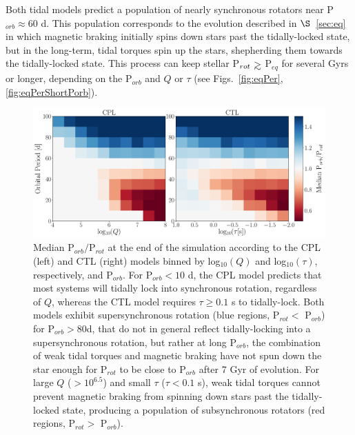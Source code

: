 \documentclass[twocolumn]{aastex61}
\def\gsim{~\rlap{$>$}{\lower 1.0ex\hbox{$\sim$}}}
\begin{document}
Both tidal models predict a population of nearly synchronous rotators near P$_{orb} \approx 60$ d.  This population corresponds to the evolution described in $\S$~\ref{sec:eq} in which magnetic braking initially spins down stars past the tidally-locked state, but in the long-term, tidal torques spin up the stars, shepherding them towards the tidally-locked state.  This process can keep stellar P$_{rot} \gsim$ P$_{eq}$ for several Gyrs or longer, depending on the P$_{orb}$ and $Q$ or $\tau$ (see Figs.~\ref{fig:eqPer},\ref{fig:eqPerShortPorb}). 

\begin{figure}[ht]
	\includegraphics[width=\textwidth]{../Plots/qTauPorbRatioHist.pdf}
   \caption{Median P$_{orb}/$P$_{rot}$ at the end of the simulation according to the CPL (left) and CTL (right) models binned by log$_{10}(Q)$ and log$_{10}(\tau)$, respectively, and P$_{orb}$.  For P$_{orb} < 10$ d, the CPL model predicts that most systems will tidally lock into synchronous rotation, regardless of $Q$, whereas the CTL model requires $\tau \geq 0.1$ s to tidally-lock.  Both models exhibit supersynchronous rotation (blue regions, P$_{rot} <$ P$_{orb}$) for P$_{orb} > 80$d, that do not in general reflect tidally-locking into a supersynchronous rotation, but rather at long P$_{orb}$, the combination of weak tidal torques and magnetic braking have not spun down the star enough for P$_{rot}$ to be close to P$_{orb}$ after 7 Gyr of evolution. For large $Q$ ($> 10^{6.5}$) and small $\tau$ ($\tau < 0.1$ s), weak tidal torques cannot prevent magnetic braking from spinning down stars past the tidally-locked state, producing a population of subsynchronous rotators (red regions, P$_{rot} >$ P$_{orb}$).}%
    \label{fig:qTauLock}%
\end{figure}

\end{document}
